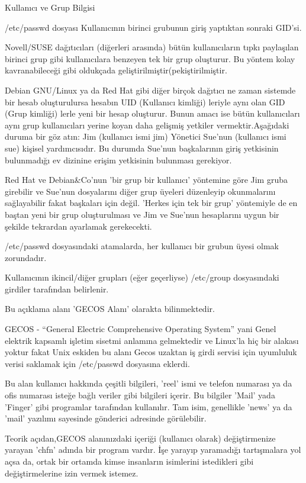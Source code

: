 \begin{section}{Kullanıcı ve Grup Bilgisi}
\begin{subsection}{/etc/passwd dosyası}
Kullanıcının birinci grubunun giriş yaptıktan sonraki GID'si.

Novell/SUSE dağıtıcıları (diğerleri arasında) bütün kullanıcıların tıpkı paylaşılan birinci grup gibi kullanıcılara benzeyen tek bir grup oluşturur. Bu yöntem kolay kavranabileceği gibi oldukçada geliştirilmiştir(pekiştirilmiştir.

Debian GNU/Linux ya da Red Hat gibi diğer birçok dağıtıcı ne zaman sistemde bir hesab oluşturulursa hesabın UID (Kullanıcı kimliği) leriyle aynı olan GID (Grup kimliği) lerle yeni bir hesap oluşturur. Bunun amacı ise bütün kullanıcıları aynı grup kullanıcıları yerine koyan daha gelişmiş yetkiler vermektir.Aşağıdaki duruma bir göz atın: Jim (kullanıcı ismi jim) Yönetici Sue'nun (kullanıcı ismi sue) kişisel yardımcısıdır. Bu durumda Sue'nun başkalarının giriş yetkisinin bulunmadığı ev dizinine erişim yetkisinin bulunması gerekiyor.

Red Hat ve Debian\&Co'nun 'bir grup bir kullanıcı' yöntemine göre Jim gruba girebilir ve Sue'nun dosyalarını diğer grup üyeleri düzenleyip okunmalarını sağlayabilir fakat başkaları için değil. 'Herkes için tek bir grup' yöntemiyle de en baştan yeni bir grup oluşturulması ve Jim ve Sue'nun hesaplarını uygun bir şekilde tekrardan ayarlamak gerekecekti.


/etc/passwd dosyasındaki atamalarda, her kullanıcı bir grubun üyesi olmak zorundadır.

Kullanıcının ikincil/diğer grupları (eğer geçerliyse) /etc/group dosyasındaki girdiler tarafından belirlenir.

Bu açıklama alanı 'GECOS Alanı' olarakta bilinmektedir.

GECOS - “General Electric Comprehensive Operating System” yani Genel elektrik kapsamlı işletim sisetmi anlamına gelmektedir ve Linux'la hiç bir alakası yoktur fakat Unix eskiden bu alanı Gecos uzaktan iş girdi servisi için uyumluluk verisi saklamak için /etc/passwd dosyasına eklerdi.

Bu alan kullanıcı hakkında çeşitli bilgileri, 'reel' ismi ve telefon numarası ya da ofis numarası isteğe bağlı veriler gibi bilgileri içerir. Bu bilgiler 'Mail' yada 'Finger' gibi programlar tarafından kullanılır. Tam isim, genellikle 'news' ya da 'mail' yazılımı sayesinde gönderici adresinde görülebilir.

Teorik açıdan,GECOS alanınızdaki içeriği (kullanıcı olarak) değiştirmenize yarayan 'chfn' adında bir program vardır. İşe yarayıp yaramadığı tartışmalara yol açsa da, ortak bir ortamda kimse insanların isimlerini istedikleri gibi değiştirmelerine izin vermek istemez.


\end{subsection}
\end{section}
